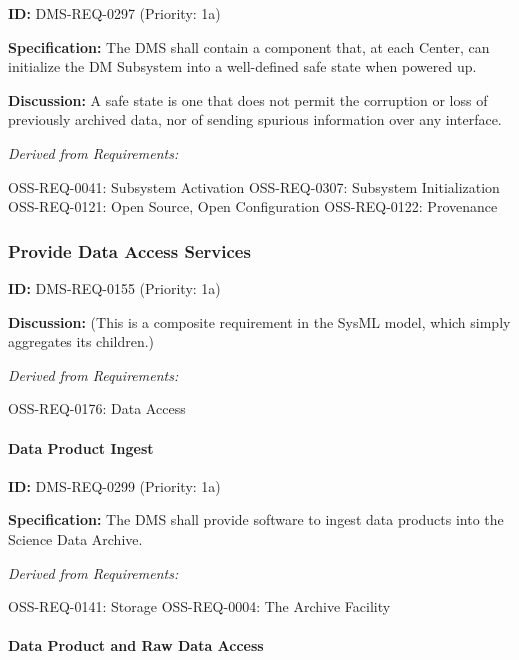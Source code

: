 \documentclass[SE,toc,lsstdraft]{lsstdoc}
\begin{document}
\label{DMS-REQ-0297}
\textbf{ID:} DMS-REQ-0297 (Priority: 1a)

\textbf{Specification:} The DMS shall contain a component that, at each Center, can initialize the DM Subsystem into a well-defined safe state when powered up.

\textbf{Discussion: }A safe state is one that does not permit the corruption or loss of previously archived data, nor of sending spurious information over any interface.

\emph{Derived from Requirements:}

OSS-REQ-0041:
Subsystem Activation \newline
OSS-REQ-0307:
Subsystem Initialization \newline
OSS-REQ-0121:
Open Source, Open Configuration \newline
OSS-REQ-0122:
Provenance \newline

\subsubsection{Provide Data Access Services}

\label{DMS-REQ-0155}
\textbf{ID:} DMS-REQ-0155 (Priority: 1a)

\textbf{Discussion:}
    (This is a composite requirement in the SysML model, which simply aggregates its children.)

\emph{Derived from Requirements:}

OSS-REQ-0176:
Data Access \newline

\paragraph{Data Product Ingest}\hfill  %

\label{DMS-REQ-0299}
\textbf{ID:} DMS-REQ-0299 (Priority: 1a)

\textbf{Specification:} The DMS shall provide software to ingest data products into the Science Data Archive.

\emph{Derived from Requirements:}

OSS-REQ-0141:
Storage \newline
OSS-REQ-0004:
The Archive Facility \newline

\paragraph{Data Product and Raw Data Access}\hfill  %
\end{document}
